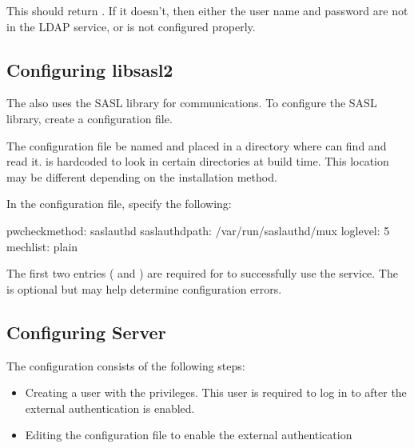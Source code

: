\documentclass[letterpaper,10pt,english]{sphinxmanual}
\begin{document}
\sphinxAtStartPar
This should return .
If it doesn’t, then either the user name and password
are not in the LDAP service, or  is not configured properly.


\subsection{Configuring libsasl2}
\label{\detokenize{sasl-auth:configuring-libsasl2}}
\sphinxAtStartPar
The  also uses the SASL library for communications. To configure the SASL library, create a configuration file.

\sphinxAtStartPar
The configuration file  be named  and placed in a directory
where  can find and read it.
 is hard\sphinxhyphen{}coded to look in certain directories at build time.
This location may be different depending on the installation method.

\sphinxAtStartPar
In the configuration file, specify the following:

\begin{sphinxVerbatim}[commandchars=\\\{\}]
pwcheck\PYGZus{}method: saslauthd
saslauthd\PYGZus{}path: /var/run/saslauthd/mux
log\PYGZus{}level: 5
mech\PYGZus{}list: plain
\end{sphinxVerbatim}

\sphinxAtStartPar
The first two entries ( and )
are required for  to successfully use the  service.
The  is optional but may help determine configuration errors.


\nopagebreak


\sphinxAtStartPar
{}




\subsection{Configuring  Server}
\label{\detokenize{sasl-auth:configuring-mongod-server}}
\sphinxAtStartPar
The configuration consists of the following steps:
\begin{itemize}
\item {} 
\sphinxAtStartPar
Creating a user with the  privileges. This user is required to log in to  after the external authentication is enabled.

\item {} 
\sphinxAtStartPar
Editing the configuration file to enable the external authentication

\end{itemize}
\end{document}
